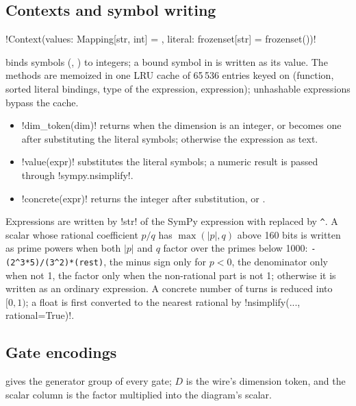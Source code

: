 \subsection{Contexts and symbol writing}

\begin{signature}
\py!Context(values: Mapping[str, int] = {}, literal: frozenset[str] = frozenset())!
\end{signature}
\noindent binds symbols (, ) to integers; a bound symbol in  is
written as its value. The methods are memoized in one LRU cache of 65\,536 entries keyed on
(function, sorted literal bindings, type of the expression, expression); unhashable
expressions bypass the cache.
\begin{itemize}
\item \py!dim_token(dim)! returns  when the dimension is an integer, or becomes
  one after substituting the literal symbols; otherwise the expression as text.
\item \py!value(expr)! substitutes the literal symbols; a numeric result is passed through
  \py!sympy.nsimplify!.
\item \py!concrete(expr)! returns the integer after substitution, or .
\end{itemize}

Expressions are written by \py!str! of the SymPy expression with \code{**} replaced by
\texttt{\^{}}. A scalar whose rational coefficient $p/q$ has $\max(|p|, q)$ above 160 bits is written
as prime powers when both $|p|$ and $q$ factor over the primes below 1000:
\texttt{-(2\^{}3*5)/(3\^{}2)*(rest)}, the minus sign only for $p<0$, the denominator only when not 1,
the factor  only when the non-rational part is not 1; otherwise it is written as
an ordinary expression. A concrete number of turns is reduced into $[0,1)$; a float is first
converted to the nearest rational by \py!nsimplify(..., rational=True)!.

\subsection{Gate encodings}

 gives the generator group of every gate; $D$ is the wire's
dimension token, and the scalar column is the factor multiplied into the diagram's scalar.


